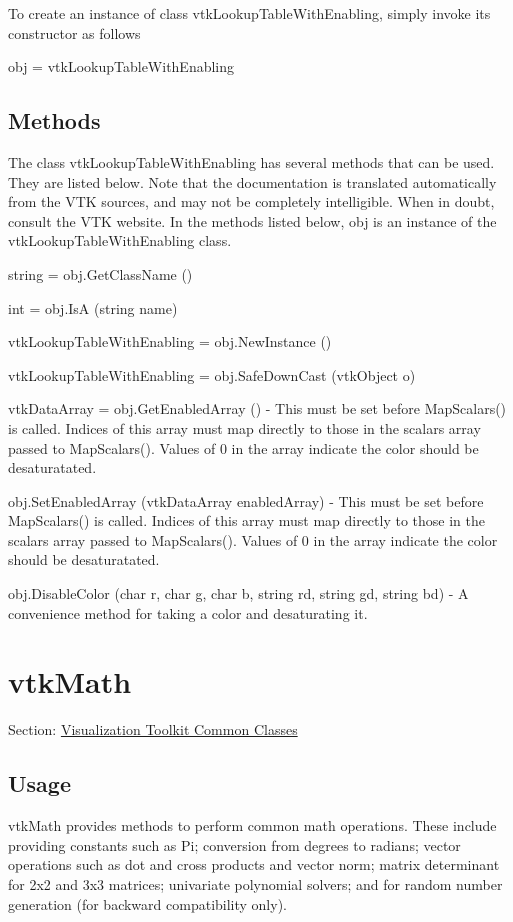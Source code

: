 To create an instance of class vtk\-Lookup\-Table\-With\-Enabling, simply invoke its constructor as follows \begin{DoxyVerb}  obj = vtkLookupTableWithEnabling
\end{DoxyVerb}
 \hypertarget{vtkwidgets_vtkxyplotwidget_Methods}{}\subsection{Methods}\label{vtkwidgets_vtkxyplotwidget_Methods}
The class vtk\-Lookup\-Table\-With\-Enabling has several methods that can be used. They are listed below. Note that the documentation is translated automatically from the V\-T\-K sources, and may not be completely intelligible. When in doubt, consult the V\-T\-K website. In the methods listed below, {\ttfamily obj} is an instance of the vtk\-Lookup\-Table\-With\-Enabling class. 
\begin{DoxyItemize}
\item {\ttfamily string = obj.\-Get\-Class\-Name ()}  
\item {\ttfamily int = obj.\-Is\-A (string name)}  
\item {\ttfamily vtk\-Lookup\-Table\-With\-Enabling = obj.\-New\-Instance ()}  
\item {\ttfamily vtk\-Lookup\-Table\-With\-Enabling = obj.\-Safe\-Down\-Cast (vtk\-Object o)}  
\item {\ttfamily vtk\-Data\-Array = obj.\-Get\-Enabled\-Array ()} -\/ This must be set before Map\-Scalars() is called. Indices of this array must map directly to those in the scalars array passed to Map\-Scalars(). Values of 0 in the array indicate the color should be desaturatated.  
\item {\ttfamily obj.\-Set\-Enabled\-Array (vtk\-Data\-Array enabled\-Array)} -\/ This must be set before Map\-Scalars() is called. Indices of this array must map directly to those in the scalars array passed to Map\-Scalars(). Values of 0 in the array indicate the color should be desaturatated.  
\item {\ttfamily obj.\-Disable\-Color (char r, char g, char b, string rd, string gd, string bd)} -\/ A convenience method for taking a color and desaturating it.  
\end{DoxyItemize}\hypertarget{vtkcommon_vtkmath}{}\section{vtk\-Math}\label{vtkcommon_vtkmath}
Section\-: \hyperlink{sec_vtkcommon}{Visualization Toolkit Common Classes} \hypertarget{vtkwidgets_vtkxyplotwidget_Usage}{}\subsection{Usage}\label{vtkwidgets_vtkxyplotwidget_Usage}
vtk\-Math provides methods to perform common math operations. These include providing constants such as Pi; conversion from degrees to radians; vector operations such as dot and cross products and vector norm; matrix determinant for 2x2 and 3x3 matrices; univariate polynomial solvers; and for random number generation (for backward compatibility only).

